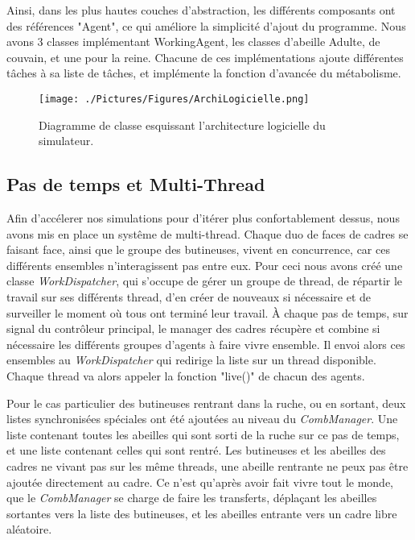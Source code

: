 			Ainsi, dans les plus hautes couches d'abstraction, les différents composants ont des références "Agent", ce qui améliore la simplicité d'ajout du programme. Nous avons 3 classes implémentant WorkingAgent, les classes d'abeille Adulte, de couvain, et une pour la reine. Chacune de ces implémentations ajoute différentes tâches à sa liste de tâches, et implémente la fonction d'avancée du métabolisme.
			
			\begin{figure}
			\centering
			\texttt{[image: ./Pictures/Figures/ArchiLogicielle.png]}
			\caption{Diagramme de classe esquissant l'architecture logicielle du simulateur.}
			\label{ArchiLogicielle}
			\end{figure}
			
			\subsection{Pas de temps et Multi-Thread}
			Afin d'accélerer nos simulations pour d'itérer plus confortablement dessus, nous avons mis en place un systême de multi-thread. Chaque duo de faces de cadres se faisant face, ainsi que le groupe des butineuses, vivent en concurrence, car ces différents ensembles n'interagissent pas entre eux. Pour ceci nous avons créé une classe \textit{WorkDispatcher}, qui s'occupe de gérer un groupe de thread, de répartir le travail sur ses différents thread, d'en créer de nouveaux si nécessaire et de surveiller le moment où tous ont terminé leur travail. À chaque pas de temps, sur signal du contrôleur principal, le manager des cadres récupère et combine si nécessaire les différents groupes d'agents à faire vivre ensemble. Il envoi alors ces ensembles au \textit{WorkDispatcher} qui redirige la liste sur un thread disponible. Chaque thread va alors appeler la fonction "live()" de chacun des agents.
			
			Pour le cas particulier des butineuses rentrant dans la ruche, ou en sortant, deux listes synchronisées spéciales ont été ajoutées au niveau du \textit{CombManager}. Une liste contenant toutes les abeilles qui sont sorti de la ruche sur ce pas de temps, et une liste contenant celles qui sont rentré. Les butineuses et les abeilles des cadres ne vivant pas sur les même threads, une abeille rentrante ne peux pas être ajoutée directement au cadre. Ce n'est qu'après avoir fait vivre tout le monde, que le \textit{CombManager} se charge de faire les transferts, déplaçant les abeilles sortantes vers la liste des butineuses, et les abeilles entrante vers un cadre libre aléatoire.
			
